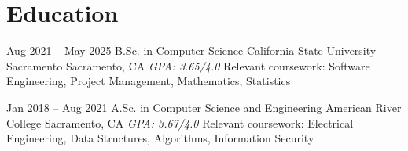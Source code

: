 \section{Education}

\cventry
    {Aug 2021 -- May 2025}
    {B.Sc. in Computer Science}
    {California State University -- Sacramento}
    {Sacramento, CA}
    {\textit{GPA: 3.65/4.0}}
    {%
        Relevant coursework: Software Engineering, Project Management,
        Mathematics, Statistics
    }

\cventry
    {Jan 2018 -- Aug 2021}
    {A.Sc. in Computer Science and Engineering}
    {American River College}
    {Sacramento, CA}
    {\textit{GPA: 3.67/4.0}}
    {%
        Relevant coursework: Electrical Engineering, Data Structures,
        Algorithms, Information Security
    }